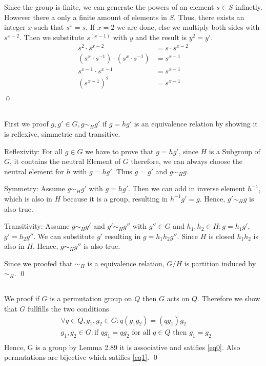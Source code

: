 \documentclass[a4paper,12pt,numbers=noenddot]{scrreport}
\begin{document}
\chapter{}
\section{}
Since the group is finite, we can generate the powers of an element $s \in S$ infinetly.
However there a only a finite amount of elements in $S$. 
Thus, there exists an integer $x$ such that $s^x=s$. 
If $x=2$ we are done, else we multiply both sides with $s^{x-2}$.
Then we substitute $s^{(x-1)}$ with $y$ and the result is $y^2 = y'$.
\begin{align*}
    s^2 \cdot s^{x-2} &= s \cdot s^{x-2} \\
    (s^{x} \cdot s^{-1}) \cdot (s^{x} \cdot s^{-1}) &= s^{x-1} \\
    s^{x-1} \cdot s^{x-1} &= s^{x-1} \\
    (s^{x-1})^2 &= s^{x-1} \\
\end{align*}
\qed

\section{}
First we proof $g,g' \in G, g \sim_H g'$ if $g = hg'$ is an equivalence relation by showing it is reflexive, simmetric and transitive.

Reflexivity:
For all $g \in G$ we have to prove that $g = hg'$, since $H$ is a Subgroup of $G$, it contains the neutral Element of $G$ therefore,
we can always choose the neutral element for $h$ with $g = hg'$. Thus
$g = g'$ and $g \sim_H g$.

Symmetry:
Assume $g \sim_H g'$ with $g = hg'$. Then we can add in inverse element $h^{-1}$, which is also in $H$ because it is a group, resulting in $h^{-1}g'= g$.
Hence, $g' \sim_H g$ is also true.

Transitivity:
Assume $g \sim_H g'$ and $g' \sim_H g''$ with $g'' \in G$ and $h_1, h_2 \in H: g = h_1g'$, $g' = h_2g''$.
We can substitute $g'$ resulting in $g = h_1h_2g''$. Since $H$ is closed $h_1h_2$ is also in $H$. 
Hence, $g \sim_H g''$ is also true.

Since we proofed that $\sim_H$ is a equivalence relation, $G/H$ is partition induced by $\sim_H$.
\qed

\section{}
We proof if $G$ is a permutation group on $Q$ then $G$ acts on $Q$.
Therefore we show that $G$ fullfills the two conditions
\begin{align*}
    & \forall q \in Q, g_1,g_2 \in G: q(g_1g_2) = (qg_1)g_2 \label{eq0}\tag{1} \\
    & g_1,g_2 \in G: \text{if } qg_1 = qg_2 \text{ for all } q \in Q \text{ then } g_1 = g_2 \label{eq1}\tag{2} \\
\end{align*}
Hence, G is a group by Lemma 2.89 it is associative and satifies \eqref{eq0}.
Also permutations are bijective which satifies \eqref{eq1}.
\qed
\end{document}
